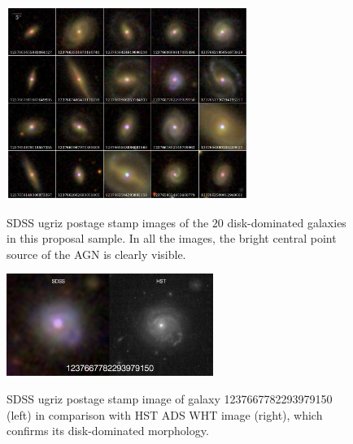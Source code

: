 \documentclass[12pt]{article}
\begin{document}
\begin{figure}[h]
\begin{centering}
\includegraphics[width=0.7\textwidth]{mosaic_lick_targets.pdf}
\caption{SDSS ugriz postage stamp images of the $20$ disk-dominated galaxies in this proposal sample. In all the images, the bright central point source of the AGN is clearly visible.}
\vspace{1.5em}


\includegraphics[width=0.6\textwidth]{fig3.png} \\
\caption{SDSS ugriz postage stamp image of galaxy 1237667782293979150 (left) in comparison with HST ADS WHT image (right), which confirms its disk-dominated morphology.}

\end{centering}
\end{figure}
\end{document}
